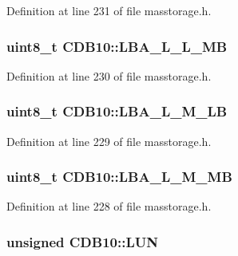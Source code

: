 \-Definition at line 231 of file masstorage.\-h.

\hypertarget{struct_c_d_b10_a82b8e9bddbdbc8ef4d8b19017743f4a9}{
\subsubsection[{\-L\-B\-A\-\_\-\-L\-\_\-\-L\-\_\-\-M\-B}]{\setlength{\rightskip}{0pt plus 5cm}uint8\-\_\-t {\bf \-C\-D\-B10\-::\-L\-B\-A\-\_\-\-L\-\_\-\-L\-\_\-\-M\-B}}}\label{struct_c_d_b10_a82b8e9bddbdbc8ef4d8b19017743f4a9}


\-Definition at line 230 of file masstorage.\-h.

\hypertarget{struct_c_d_b10_aa74c5c59a4bdfeb2aa6e8c163f1fae10}{
\subsubsection[{\-L\-B\-A\-\_\-\-L\-\_\-\-M\-\_\-\-L\-B}]{\setlength{\rightskip}{0pt plus 5cm}uint8\-\_\-t {\bf \-C\-D\-B10\-::\-L\-B\-A\-\_\-\-L\-\_\-\-M\-\_\-\-L\-B}}}\label{struct_c_d_b10_aa74c5c59a4bdfeb2aa6e8c163f1fae10}


\-Definition at line 229 of file masstorage.\-h.

\hypertarget{struct_c_d_b10_ae954128996312f8c1ac3ef9982dfb033}{
\subsubsection[{\-L\-B\-A\-\_\-\-L\-\_\-\-M\-\_\-\-M\-B}]{\setlength{\rightskip}{0pt plus 5cm}uint8\-\_\-t {\bf \-C\-D\-B10\-::\-L\-B\-A\-\_\-\-L\-\_\-\-M\-\_\-\-M\-B}}}\label{struct_c_d_b10_ae954128996312f8c1ac3ef9982dfb033}


\-Definition at line 228 of file masstorage.\-h.

\hypertarget{struct_c_d_b10_a451be0bca5ee00395c3f6c6993ac384a}{
\subsubsection[{\-L\-U\-N}]{\setlength{\rightskip}{0pt plus 5cm}unsigned {\bf \-C\-D\-B10\-::\-L\-U\-N}}}\label{struct_c_d_b10_a451be0bca5ee00395c3f6c6993ac384a}


